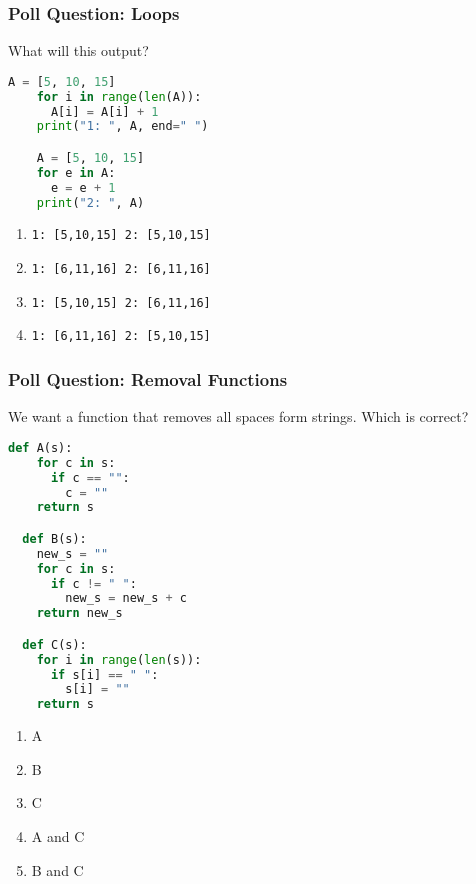 \documentclass{beamer}
\begin{document}
%
%
\begin{frame}[fragile]
  \frametitle{Poll Question: Loops}
  What will this output?\\
  \begin{minipage}{0.48\textwidth}
    \begin{lstlisting}[language=Python, autogobble]
    A = [5, 10, 15]
    for i in range(len(A)):
      A[i] = A[i] + 1
    print("1: ", A, end=" ")

    A = [5, 10, 15]
    for e in A:
      e = e + 1
    print("2: ", A)
    \end{lstlisting}
  \end{minipage}
  \hfill
  \begin{minipage}{0.48\textwidth}
    \begin{enumerate}[A]
      \item \lstinline|1: [5,10,15] 2: [5,10,15]|
      \item \lstinline|1: [6,11,16] 2: [6,11,16]|
      \item \lstinline|1: [5,10,15] 2: [6,11,16]|
      \item \lstinline|1: [6,11,16] 2: [5,10,15]|
    \end{enumerate}
  \end{minipage}
\end{frame}

%
%
\begin{frame}[fragile]
  \frametitle{Poll Question: Removal Functions}
  We want a function that removes all spaces form strings. Which is correct?\\
  \hfill
  \begin{minipage}{0.48\textwidth}
    \begin{lstlisting}[language=Python, autogobble, basicstyle=\tiny]
  def A(s):
    for c in s:
      if c == "":
        c = ""
    return s

  def B(s):
    new_s = ""
    for c in s:
      if c != " ":
        new_s = new_s + c
    return new_s

  def C(s):
    for i in range(len(s)):
      if s[i] == " ":
        s[i] = ""
    return s\end{lstlisting}
  \end{minipage}
  \hfill
  \begin{minipage}{0.48\textwidth}
    \hfill
    \begin{enumerate}[A]
      \item A
      \item B
      \item C
      \item A and C
      \item B and C
    \end{enumerate}
  \end{minipage}
\end{frame}
\end{document}
